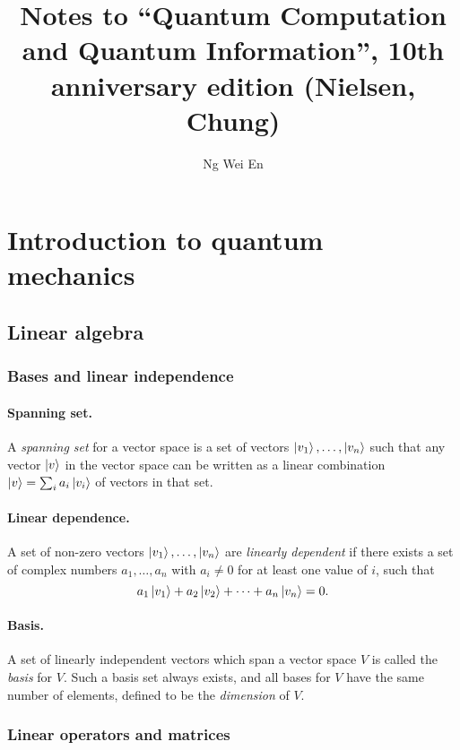 \documentclass{article}
\title{Notes to ``Quantum Computation and Quantum Information'', 10th
anniversary edition (Nielsen, Chung)}
\author{Ng Wei En}
\numberwithin{theorem}{section}
\numberwithin{corollary}{section}
\numberwithin{postulate}{section}
\begin{document}
\maketitle
\tableofcontents
\newpage

\setcounter{section}{1}
\section{Introduction to quantum mechanics}

\subsection{Linear algebra}

\subsubsection{Bases and linear independence}

\paragraph{Spanning set.} A \emph{spanning set} for a vector space is a set of
vectors $\ket{v_1}, \ldots, \ket{v_n}$ such that any vector $\ket{v}$ in the
vector space can be written as a linear combination $\ket{v} = \sum_i
a_i\ket{v_i}$ of vectors in that set.

\paragraph{Linear dependence.} A set of non-zero vectors $\ket{v_1}, \ldots,
\ket{v_n}$ are \emph{linearly dependent} if there exists a set of complex
numbers $a_1, \ldots, a_n$ with $a_i \neq 0$ for at least one value of $i$,
such that \[
  a_1\ket{v_1} + a_2\ket{v_2} + \cdots + a_n\ket{v_n} = 0.
\]

\paragraph{Basis.} A set of linearly independent vectors which span a vector
space $V$ is called the \emph{basis} for $V$. Such a basis set always exists,
and all bases for $V$ have the same number of elements, defined to be the
\emph{dimension} of $V$.

\subsubsection{Linear operators and matrices}
\end{document}
